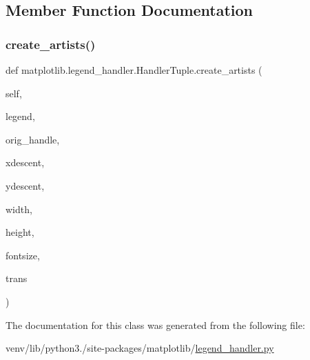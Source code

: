 \subsection{Member Function Documentation}
\mbox{\label{classmatplotlib_1_1legend__handler_1_1HandlerTuple_a0724ba39f2f44fee049c6377a96a1d06}} 
\subsubsection{\texorpdfstring{create\+\_\+artists()}{create\_artists()}}
{\footnotesize\ttfamily def matplotlib.\+legend\+\_\+handler.\+Handler\+Tuple.\+create\+\_\+artists (\begin{DoxyParamCaption}\item[{}]{self,  }\item[{}]{legend,  }\item[{}]{orig\+\_\+handle,  }\item[{}]{xdescent,  }\item[{}]{ydescent,  }\item[{}]{width,  }\item[{}]{height,  }\item[{}]{fontsize,  }\item[{}]{trans }\end{DoxyParamCaption})}



The documentation for this class was generated from the following file\+:\begin{DoxyCompactItemize}
\item 
venv/lib/python3./site-\/packages/matplotlib/\hyperlink{legend__handler_8py}{legend\+\_\+handler.\+py}\end{DoxyCompactItemize}
